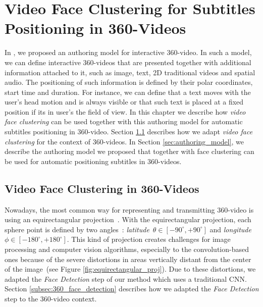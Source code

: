 \newpage
\chapter{Video Face Clustering for Subtitles Positioning in 360-Videos}
\label{chap:subtitles_positioning}

In \cite{mendes2020authoring}, we proposed an authoring model for interactive 360-video. In such a model, we can define interactive 360-videos that are presented together with additional information attached to it, such as image, text, 2D traditional videos and spatial audio. The positioning of such information is defined by their polar coordinates, start time and duration. For instance, we can define that a text moves with the user's head motion and is always visible or that such text is placed at a fixed position if its in user's the field of view. In this chapter we describe how \emph{video face clustering} can be used together with this authoring model for automatic subtitles positioning in 360-video. Section \ref{sec:authoring_clustering_360} describes how we adapt \emph{video face clustering} for the context of 360-videos. In Section \ref{sec:authoring_model}, we describe the authoring model we proposed that together with face clustering can be used for automatic positioning subtitles in 360-videos.
 
\section{Video Face Clustering in 360-Videos}

\label{sec:authoring_clustering_360}

Nowadays, the most common way for representing and transmitting 360-video is using an equirectangular projection~\cite{yang2018object}. With the equirectangular projection, each sphere point is defined by two angles~\cite{snyder1987map}: \emph{latitude}~$\theta \in [-90^{\circ}, +90^{\circ}]$ and \emph{longitude}~$\phi \in [-180^{\circ}, +180^{\circ}]$. This kind of projection creates challenges for image processing and computer vision algorithms, especially to the convolution-based ones because of the severe distortions in areas vertically distant from the center of the image~(see Figure \ref{fig:equirectangular_proj}). Due to these distortions, we adapted the \emph{Face Detection} step of our method which uses a traditional CNN. Section \ref{subsec:360_face_detection} describes how we adapted the \emph{Face Detection} step to the 360-video context.

